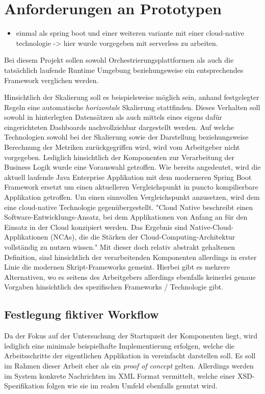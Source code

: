 \section{Anforderungen an Prototypen}
\begin{itemize}
  \item einmal als spring boot und einer weiteren variante mit einer cloud-native technologie -> hier wurde vorgegeben mit serverless zu arbeiten.
\end{itemize}

Bei diesem Projekt sollen sowohl Orchestrierungsplattformen als auch die tatsächlich laufende Runtime Umgebung beziehungsweise ein entsprechendes Framework verglichen werden. 

Hinsichtlich der Skalierung soll es beispielsweise möglich sein, anhand festgelegter Regeln eine automatische \emph{horizontale} Skalierung stattfinden. Dieses Verhalten soll sowohl in hinterlegten Datensätzen als auch mittels eines eigens dafür eingerichteten Dashboards nachvollziehbar dargestellt werden. Auf welche Technologien sowohl bei der Skalierung sowie der Darstellung beziehungsweise Berechnung der Metriken zurückgegriffen wird, wird vom Arbeitgeber nicht vorgegeben. Lediglich hinsichtlich der Komponenten zur Verarbeitung der Business Logik wurde eine Vorauswahl getroffen. Wie bereits angedeutet, wird die aktuell laufende Java Enterprise Applikation mit dem moderneren Spring Boot Framework ersetzt um einen aktuelleren Vergleichspunkt in puncto kompilierbare Applikation getroffen. Um einen sinnvollen Vergleichspunkt anzusetzen, wird dem eine cloud-native Technologie gegenübergestellt. "Cloud Native beschreibt einen Software-Entwicklungs-Ansatz, bei dem Applikationen von Anfang an für den Einsatz in der Cloud konzipiert werden. Das Ergebnis sind Native-Cloud-Applikationen (NCAs), die die Stärken der Cloud-Computing-Architektur vollständig zu nutzen wissen." \cite{cn-def} Mit dieser doch relativ abstrakt gehaltenen Definition, sind hinsichtlich der verarbeitenden Komponenten allerdings in erster Linie die modernen Skript-Frameworks gemeint. Hierbei gibt es mehrere Alternativen, wo es seitens des Arbeitgebers allerdings ebenfalls keinerlei genaue Vorgaben hinsichtlich des spezifischen Frameworks / Technologie gibt.

\subsection{Festlegung fiktiver Workflow}
Da der Fokus auf der Untersuchung der Startupzeit der Komponenten liegt, wird lediglich eine minimale beispielhafte Implementierung erfolgen, welche die Arbeitsschritte der eigentlichen Applikation in vereinfacht darstellen soll. Es soll im Rahmen dieser Arbeit eher als ein \emph{proof of concept} gelten. Allerdings werden im System konkrete Nachrichten im XML Format vermittelt, welche einer XSD-Spezifikation folgen wie sie im realen Umfeld ebenfalls genutzt wird. 


